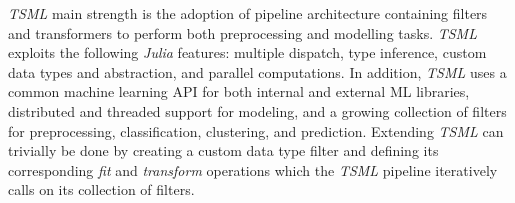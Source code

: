 \documentclass{juliacon}
\begin{document}
\vskip 6pt

\emph{TSML} main strength is the adoption of pipeline architecture containing filters and transformers to perform both preprocessing and modelling tasks. \emph{TSML}  exploits the following \emph{Julia} features: multiple dispatch, type inference, custom data types and abstraction, and parallel computations.  In addition, \emph{TSML} uses a common machine learning API for both internal and external ML libraries, distributed and threaded support for modeling, and a growing collection of filters for preprocessing, classification, clustering, and prediction. Extending \emph{TSML} can trivially be done by creating a custom data type filter and defining its corresponding \emph{fit} and \emph{transform} operations which the \emph{TSML} pipeline iteratively calls on its collection of filters.



\end{document}
